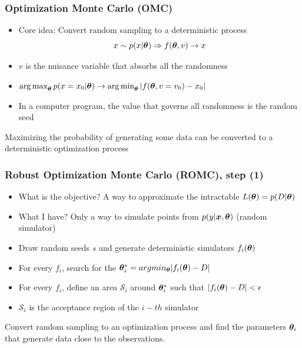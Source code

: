 \begin{frame}
  \frametitle{Optimization Monte Carlo (OMC)}
  \begin{itemize}
    \item Core idea: \alert{Convert random sampling to a deterministic process} \cite{NIPS2015_a284df11}
      \begin{equation}
        x \sim p(x|\boldsymbol{\theta}) \Rightarrow f(\boldsymbol{\theta}, v) \rightarrow x
      \end{equation}

      \item $v$ is the nuisance variable that absorbs all the randomness
      \item $\operatorname*{arg\,max}_{\boldsymbol{\theta}} p(x=x_0|\boldsymbol{\theta}) \rightarrow \operatorname*{arg\,min}_{\boldsymbol{\theta}}|f(\boldsymbol{\theta}, v=v_0) - x_0| $
      \item In a computer program, the value that governs all randomness is the random seed
  \end{itemize}

  \noindent\makebox[\linewidth]{\rule{\paperwidth}{0.4pt}}
  Maximizing the probability of generating some data can be converted to a \alert{deterministic optimization process}
\end{frame}

\begin{frame}
  \frametitle{Robust Optimization Monte Carlo (ROMC), step (1)}
  \begin{itemize}
  \item What is the objective? A way to approximate the intractable $L(\boldsymbol{\theta})=p(D|\boldsymbol{\theta})$
  \item What I have? Only a way to simulate points from
    $p(y|\boldsymbol{x}, \boldsymbol{\theta})$ (random simulator)
  \item Draw random seeds $s$ and generate deterministic simulators $f_i(\boldsymbol{\theta})$
  \item For every $f_i$, search for the
    $\boldsymbol{\theta}_i^* = argmin_{\boldsymbol{\theta}} |f_i(\boldsymbol{\theta}) - D|$
  \item For every $f_i$, define an area $\mathcal{S}_i$ around
    $\boldsymbol{\theta}_i^*$ such that $|f_i(\boldsymbol{\theta}) - D| < \epsilon$
  \item $\mathcal{S}_i$ is the acceptance region of the $i-th$ simulator
  \end{itemize}

  \noindent\makebox[\linewidth]{\rule{\paperwidth}{0.4pt}}
  Convert random sampling to an optimization process and find the parameters $\boldsymbol{\theta}_i$ that generate data close to the observations.

\end{frame}

